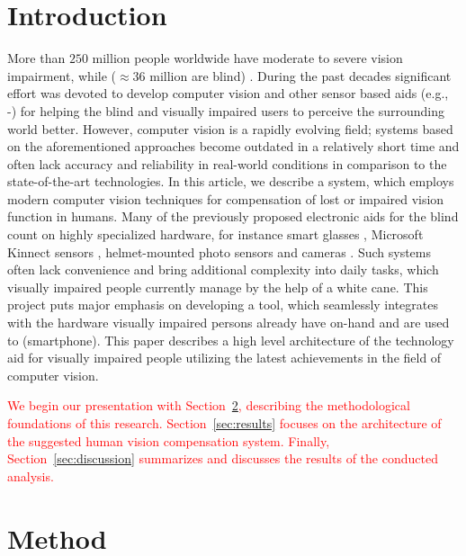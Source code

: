 \documentclass[10pt,conference,compsocconf]{IEEEtran}
\begin{document}
\section{Introduction}
\label{sec:introduction}
More than $250$ million people worldwide have moderate to severe vision impairment, while ($\approx 36$ million are blind) \cite{Bourne}. During the past decades significant effort was devoted to develop computer vision and other sensor based aids (e.g., \cite{Caraiman}-\cite{Zientara}) for helping the blind and visually impaired users to perceive the surrounding world better. However, computer vision is a rapidly evolving field; systems based on the aforementioned approaches become outdated in a relatively short time and often lack accuracy and reliability in real-world conditions in comparison to the state-of-the-art technologies. In this article, we describe a system, which employs modern computer vision techniques for compensation of lost or impaired vision function in humans. Many of the previously proposed electronic aids for the blind count on highly specialized hardware, for instance smart glasses \cite{Zientara}, Microsoft Kinnect sensors \cite{Owayjan}, helmet-mounted photo sensors and cameras \cite{Dunai}. Such systems often lack convenience and bring additional complexity into daily tasks, which visually impaired people currently manage by the help of a white cane. This project puts major emphasis on developing a tool, which seamlessly integrates with the hardware visually impaired persons already have on-hand and are used to (smartphone). This paper describes a high level architecture of the technology aid for visually impaired people utilizing the latest achievements in the field of computer vision. 

\textcolor{red}{We begin our presentation with Section~\ref{sec:method}, describing the methodological foundations of this research. Section~\ref{sec:results} focuses on the architecture of the suggested human vision compensation system. Finally, Section~\ref{sec:discussion} summarizes and discusses the results of the conducted analysis.}


\section{Method}
\label{sec:method}
\end{document}
